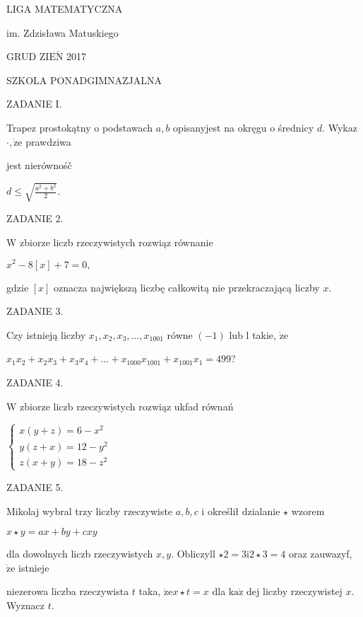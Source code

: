 \documentclass[a4paper,12pt]{article}
\begin{document}
LIGA MATEMATYCZNA

im. Zdzisława Matuskiego

GRUD Z$\mathrm{I}\mathrm{E}\acute{\mathrm{N}}$ 2017

SZKOLA PONADGIMNAZJALNA

ZADANIE I.

Trapez prostokątny o podstawach $a, b$ opisanyjest na okręgu o średnicy $d$. Wykaz$\cdot, \dot{\mathrm{z}}\mathrm{e}$ prawdziwa

jest nierównośč

$d\leq\sqrt{\frac{a^{2}+b^{2}}{2}}.$

ZADANIE 2.

$\mathrm{W}$ zbiorze liczb rzeczywistych rozwiąz równanie

$x^{2}-8[x]+7=0,$

gdzie $[x]$ oznacza największą liczbę całkowitą nie przekraczającą liczby $x.$

ZADANIE 3.

Czy istnieją liczby $x_{1}, x_{2}, x_{3}, \ldots, x_{1001}$ równe $(-1)$ lub l takie, $\dot{\mathrm{z}}\mathrm{e}$

$x_{1}x_{2}+x_{2}x_{3}+x_{3}x_{4}+\ldots+x_{1000}x_{1001}+x_{1001}x_{1}=499$?

ZADANIE 4.

$\mathrm{W}$ zbiorze liczb rzeczywistych rozwiąz ukfad równań

$\left\{\begin{array}{l}
x(y+z)=6-x^{2}\\
y(z+x)=12-y^{2}\\
z(x+y)=18-z^{2}
\end{array}\right.$

ZADANIE 5.

Mikolaj wybral trzy liczby rzeczywiste $a, b, c$ i określił dzialanie $\star$ wzorem

$x\star y=ax+by+cxy$

dla dowolnych liczb rzeczywistych $x, y$. Obliczyll $\star 2=3\mathrm{i}2\star 3=4$ oraz zauwazyf, $\dot{\mathrm{z}}\mathrm{e}$ istnieje

niezerowa liczba rzeczywista $t$ taka, $\dot{\mathrm{z}}\mathrm{e}x\star t=x$ dla $\mathrm{k}\mathrm{a}\dot{\mathrm{z}}$ dej liczby rzeczywistej $x$. Wyznacz $t.$
\end{document}
